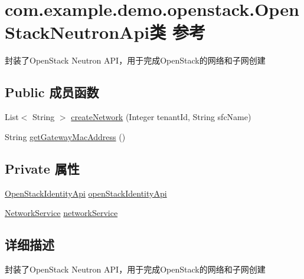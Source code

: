 \hypertarget{classcom_1_1example_1_1demo_1_1openstack_1_1_open_stack_neutron_api}{}\section{com.\+example.\+demo.\+openstack.\+Open\+Stack\+Neutron\+Api类 参考}
\label{classcom_1_1example_1_1demo_1_1openstack_1_1_open_stack_neutron_api}


封装了\+Open\+Stack Neutron A\+P\+I，用于完成\+Open\+Stack的网络和子网创建  


\subsection*{Public 成员函数}
\begin{DoxyCompactItemize}
\item 
List$<$ String $>$ \mbox{\hyperlink{classcom_1_1example_1_1demo_1_1openstack_1_1_open_stack_neutron_api_aa3a93b264c9a0b4a101339de16f173a1}{create\+Network}} (Integer tenant\+Id, String sfc\+Name)
\item 
String \mbox{\hyperlink{classcom_1_1example_1_1demo_1_1openstack_1_1_open_stack_neutron_api_af6b5be7635684e223b58a9a326303d86}{get\+Gateway\+Mac\+Address}} ()
\end{DoxyCompactItemize}
\subsection*{Private 属性}
\begin{DoxyCompactItemize}
\item 
\mbox{\hyperlink{classcom_1_1example_1_1demo_1_1openstack_1_1_open_stack_identity_api}{Open\+Stack\+Identity\+Api}} \mbox{\hyperlink{classcom_1_1example_1_1demo_1_1openstack_1_1_open_stack_neutron_api_a5b2dc729666ffab1f9a3f9bf6925ff86}{open\+Stack\+Identity\+Api}}
\item 
\mbox{\hyperlink{classcom_1_1example_1_1demo_1_1service_1_1_network_service}{Network\+Service}} \mbox{\hyperlink{classcom_1_1example_1_1demo_1_1openstack_1_1_open_stack_neutron_api_ab1cc7a43d46bd353a61f1c80d1d04653}{network\+Service}}
\end{DoxyCompactItemize}


\subsection{详细描述}
封装了\+Open\+Stack Neutron A\+P\+I，用于完成\+Open\+Stack的网络和子网创建 

